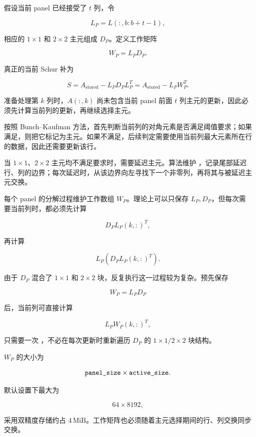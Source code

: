 假设当前 panel 已经接受了 $t$ 列，令

\[
L_P=L(:,b:b+t-1),
\]

相应的 $1\times1$ 和 $2\times2$ 主元组成 $D_P$。定义工作矩阵

\[
W_P=L_PD_P.
\]

真正的当前 Schur 补为

\[
S=A_{\mathrm{stored}}-L_PD_PL_P^T
=A_{\mathrm{stored}}-L_PW_P^T.
\]

准备处理第 $k$ 列时，$A(:,k)$ 尚未包含当前 panel 前面 $t$ 列主元的更新，因此必须先计算当前列的更新，再继续选择主元。

按照 Bunch--Kaufman 方法，首先判断当前列的对角元素是否满足阈值要求；如果满足，则把它标记为主元。如果不满足，后续判定需要使用当前列最大元素所在行的数据，因此还需要更新该行。

当 $1\times1$、$2\times2$ 主元均不满足要求时，需要延迟主元。算法维护 ，记录尾部延迟行、列的边界；每次延迟时，从该边界向左寻找下一个非零列，再将其与被延迟主元交换。

每个 panel 的分解过程维护工作数组 $W_P$。理论上可以只保存 $L_P,D_P$，但每次需要当前列时，都必须先计算

\[
D_PL_P(k,:)^T,
\]

再计算

\[
L_P\left(D_PL_P(k,:)^T\right).
\]

由于 $D_P$ 混合了 $1\times1$ 和 $2\times2$ 块，反复执行这一过程较为复杂。预先保存

\[
W_P=L_PD_P
\]

后，当前列可直接计算

\[
L_PW_P(k,:)^T,
\]

只需要一次 ，不必在每次更新时重新遍历 $D_P$ 的 $1\times1/2\times2$ 块结构。

$W_P$ 的大小为

\[
\texttt{panel\_size}\times\texttt{active\_size}.
\]

默认设置下最大为

\[
64\times8192,
\]

采用双精度存储约占 $4\,\mathrm{MiB}$。工作矩阵也必须随着主元选择期间的行、列交换同步交换。
